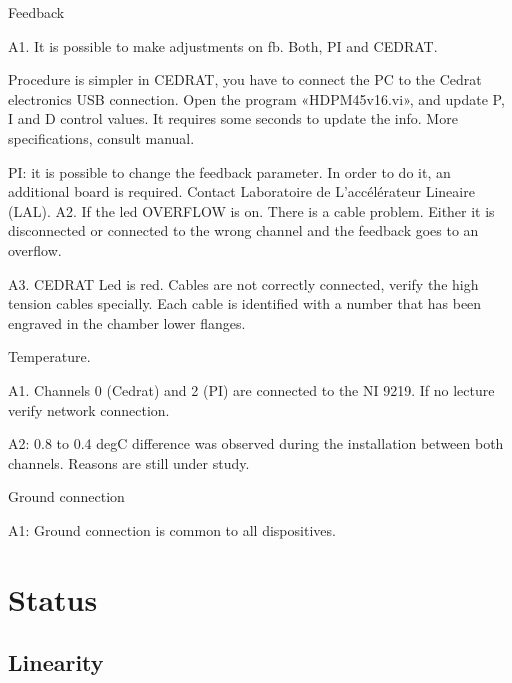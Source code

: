 \documentclass[a4paper,11pt]{book}
\begin{document}
Feedback\par 
A1. It is possible to make adjustments on fb. Both, PI and CEDRAT. \par 
Procedure is simpler in CEDRAT, you have to connect the PC to the Cedrat electronics USB connection. Open the program «HDPM45v16.vi», and update P, I and D control values. It requires some seconds to update the info. More specifications, consult manual.\par 
PI: it is possible to change the feedback parameter. In order to do it, an additional board is required. Contact Laboratoire de L'accélérateur Lineaire (LAL).
A2. If the led OVERFLOW is on. There is a cable problem. Either it is disconnected or connected to the wrong channel and the feedback goes to an overflow.\par 
A3. CEDRAT Led is red. Cables are not correctly connected, verify the high tension cables specially. Each cable is identified with a number that has been engraved in the chamber lower flanges.\par 

Temperature.\par 
A1. Channels 0 (Cedrat) and 2 (PI) are connected to the NI 9219. If no lecture verify network connection.\par 
A2: 0.8 to 0.4 degC difference was observed during the installation between both channels. Reasons are still under study.\par 

Ground connection\par 
A1: Ground connection is common to all dispositives. \par 
\mainmatter
\chapter{Status}
\section{Linearity}
\end{document}
